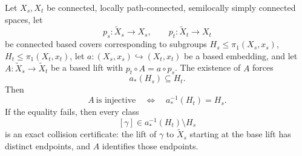 \begin{theorem}
\label{thm:subgroup-reflection-criterion}
Let \(X_s,X_t\) be connected, locally path-connected, semilocally simply
connected spaces, let
\[
 p_s:\widetilde X_s\to X_s,\qquad p_t:\widetilde X_t\to X_t
\]
be connected based covers corresponding to subgroups
\(H_s\le\pi_1(X_s,x_s)\), \(H_t\le\pi_1(X_t,x_t)\), let
\(a:(X_s,x_s)\hookrightarrow(X_t,x_t)\) be a based embedding, and let
\(A:\widetilde X_s\to\widetilde X_t\) be a based lift with
\(p_t\circ A=a\circ p_s\).  The existence of \(A\) forces
\[
 a_*(H_s)\subseteq H_t .
\]
Then
\[
 A\ \text{is injective}
 \quad\Longleftrightarrow\quad
 a_*^{-1}(H_t)=H_s .
\]
If the equality fails, then every class
\[
 [\gamma]\in a_*^{-1}(H_t)\setminus H_s
\]
is an exact collision certificate: the lift of \(\gamma\) to
\(\widetilde X_s\) starting at the base lift has distinct endpoints,
and \(A\) identifies those endpoints.
\end{theorem}

